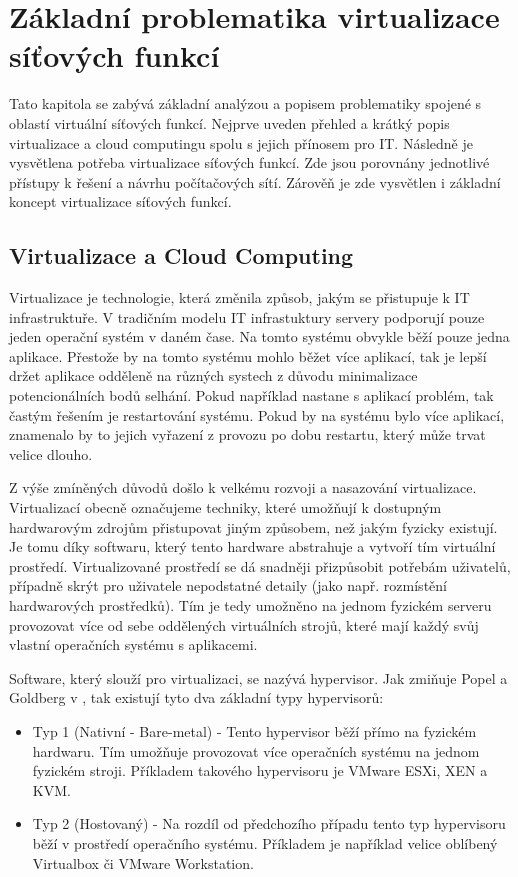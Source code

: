 \chapter{Základní problematika virtualizace síťových funkcí}

Tato kapitola se zabývá základní analýzou a popisem problematiky spojené s oblastí virtuální síťových funkcí. Nejprve uveden přehled a krátký popis virtualizace a cloud computingu spolu s jejich přínosem pro IT. Následně je vysvětlena potřeba virtualizace síťových funkcí. Zde jsou porovnány jednotlivé přístupy k řešení a návrhu počítačových sítí. Zárověň je zde vysvětlen i základní koncept virtualizace síťových funkcí.

\section{Virtualizace a Cloud Computing}

Virtualizace je technologie, která změnila způsob, jakým se přistupuje k IT infrastruktuře. V tradičním modelu IT infrastuktury servery podporují pouze jeden operační systém v daném čase. Na tomto systému obvykle běží pouze jedna aplikace. Přestože by na tomto systému mohlo běžet více aplikací, tak je lepší držet aplikace odděleně na různých systech z důvodu minimalizace potencionálních bodů selhání. Pokud například nastane s aplikací problém, tak častým řešením je restartování systému. Pokud by na systému bylo více aplikací, znamenalo by to jejich vyřazení z provozu po dobu restartu, který může trvat velice dlouho. \cite{VM_book}

Z výše zmíněných důvodů došlo k velkému rozvoji a nasazování virtualizace. Virtualizací obecně označujeme techniky, které umožňují k dostupným hardwarovým zdrojům přistupovat jiným způsobem, než jakým fyzicky existují. Je tomu díky softwaru, který tento hardware abstrahuje a vytvoří tím virtuální prostředí. Virtualizované prostředí se dá snadněji přizpůsobit potřebám uživatelů, případně skrýt pro uživatele nepodstatné detaily (jako např. rozmístění hardwarových prostředků). Tím je tedy umožněno na jednom fyzickém serveru provozovat více od sebe oddělených virtuálních strojů, které mají každý svůj vlastní operačních systému s aplikacemi.

Software, který slouží pro virtualizaci, se nazývá hypervisor. Jak zmiňuje Popel a Goldberg v \cite{VM_architektura}, tak existují tyto dva základní typy hypervisorů:

\begin{itemize}
\item Typ 1 (Nativní - Bare-metal) - Tento hypervisor běží přímo na fyzickém hardwaru. Tím umožňuje provozovat více operačních systému na jednom fyzickém stroji. Příkladem takového hypervisoru je VMware ESXi, XEN a KVM.
\item Typ 2 (Hostovaný) - Na rozdíl od předchozího případu tento typ hypervisoru běží v prostředí operačního systému. Příkladem je například velice oblíbený Virtualbox či VMware Workstation.
\end{itemize}

